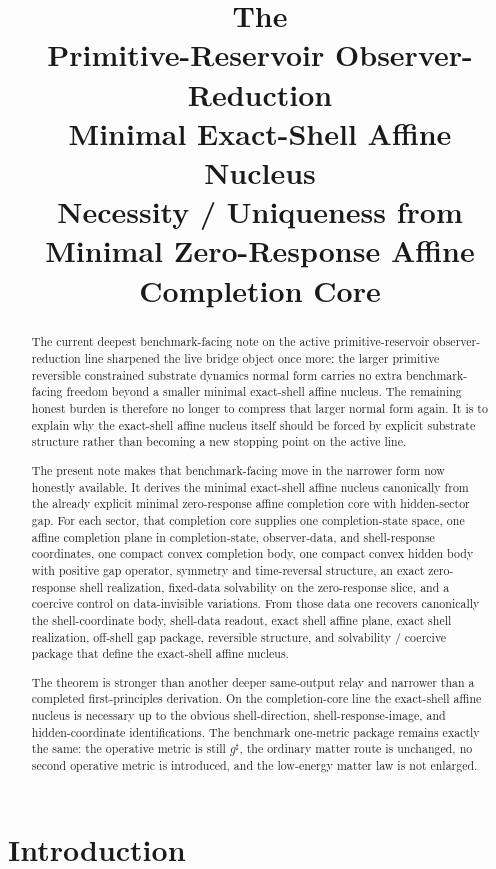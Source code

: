 \documentclass[11pt]{article}
\title{\textbf{The \TheoryName{}}\\[0.4em]
\large Primitive-Reservoir Observer-Reduction\\
\large Minimal Exact-Shell Affine Nucleus\\
\large Necessity / Uniqueness from Minimal Zero-Response Affine Completion Core}
\author{}
\date{}
\newcommand{\CompletedMetric}{g^{\sharp}}
\begin{document}
\maketitle

\begin{abstract}
The current deepest benchmark-facing note on the active primitive-reservoir observer-reduction line sharpened the live bridge object once more: the larger primitive reversible constrained substrate dynamics normal form carries no extra benchmark-facing freedom beyond a smaller minimal exact-shell affine nucleus. The remaining honest burden is therefore no longer to compress that larger normal form again. It is to explain why the exact-shell affine nucleus itself should be forced by explicit substrate structure rather than becoming a new stopping point on the active line.

The present note makes that benchmark-facing move in the narrower form now honestly available. It derives the minimal exact-shell affine nucleus canonically from the already explicit minimal zero-response affine completion core with hidden-sector gap. For each sector, that completion core supplies one completion-state space, one affine completion plane in completion-state, observer-data, and shell-response coordinates, one compact convex completion body, one compact convex hidden body with positive gap operator, symmetry and time-reversal structure, an exact zero-response shell realization, fixed-data solvability on the zero-response slice, and a coercive control on data-invisible variations. From those data one recovers canonically the shell-coordinate body, shell-data readout, exact shell affine plane, exact shell realization, off-shell gap package, reversible structure, and solvability / coercive package that define the exact-shell affine nucleus.

The theorem is stronger than another deeper same-output relay and narrower than a completed first-principles derivation. On the completion-core line the exact-shell affine nucleus is necessary up to the obvious shell-direction, shell-response-image, and hidden-coordinate identifications. The benchmark one-metric package remains exactly the same: the operative metric is still \(\CompletedMetric\), the ordinary matter route is unchanged, no second operative metric is introduced, and the low-energy matter law is not enlarged.
\end{abstract}

\section{Introduction}
\end{document}
